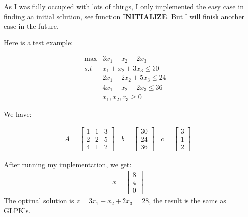 \documentclass[a4paper,12pt]{article}
\begin{document}
As I was fully occupied with lots of things, I only implemented the easy case in finding an initial solution, see function \textbf{INITIALIZE}. But I will finish another case in the future.

Here is a test example:

\[
\begin{array}{rrrrrrrrl}
 \max & 3x_1 + x_2 + 2x_3&   \\
 s.t. & x_1 + x_2 + 3x_3 \leq 30 &  \\ \tag{9}
      & 2x_1 + 2x_2 + 5x_3 \leq 24 & \\
      & 4x_1 + x_2 + 2x_3 \leq 36 & \\
      & x_1, x_2, x_3 \geq 0
\end{array} \nonumber
\]

We have:

\begin{gather*}
A=\begin{bmatrix}
1 & 1 & 3\\
2 & 2 & 5\\
4 & 1 & 2
\end{bmatrix}~~~~
b=\begin{bmatrix}
30\\
24\\
36
\end{bmatrix}~~~~
c=\begin{bmatrix}
3\\
1\\
2
\end{bmatrix}
\end{gather*}

After running my implementation, we get:
\begin{gather*}
x=\begin{bmatrix}
8\\
4\\
0
\end{bmatrix}
\end{gather*}
The optimal solution is $z=3x_1+x_2+2x_3=28$, the result is the same as GLPK's.
\end{document}
